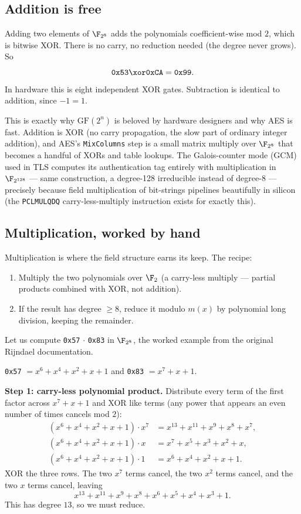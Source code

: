 \subsection{Addition is free}

Adding two elements of $\F_{2^8}$ adds the polynomials coefficient-wise mod
$2$, which is bitwise XOR. There is no carry, no reduction needed (the degree
never grows). So
\[
\texttt{0x53} \xor \texttt{0xCA} = \texttt{0x99}.
\]
In hardware this is eight independent XOR gates. Subtraction is identical to
addition, since $-1 = 1$.

\begin{applicationbox}
This is exactly why $\mathrm{GF}(2^n)$ is beloved by hardware designers and
why AES is fast. Addition is XOR (no carry propagation, the slow part of
ordinary integer addition), and AES's \texttt{MixColumns} step is a small
matrix multiply over $\F_{2^8}$ that becomes a handful of XORs and table
lookups. The Galois-counter mode (GCM) used in TLS computes its
authentication tag entirely with multiplication in $\F_{2^{128}}$ --- same
construction, a degree-128 irreducible instead of degree-8 --- precisely
because field multiplication of bit-strings pipelines beautifully in silicon
(the \texttt{PCLMULQDQ} carry-less-multiply instruction exists for exactly
this).
\end{applicationbox}

\subsection{Multiplication, worked by hand}

Multiplication is where the field structure earns its keep. The recipe:
\begin{enumerate}
  \item Multiply the two polynomials over $\F_2$ (a carry-less multiply ---
        partial products combined with XOR, not addition).
  \item If the result has degree $\geq 8$, reduce it modulo $m(x)$ by
        polynomial long division, keeping the remainder.
\end{enumerate}

Let us compute \texttt{0x57} $\cdot$ \texttt{0x83} in $\F_{2^8}$, the worked
example from the original Rijndael documentation.

\texttt{0x57} $= x^6 + x^4 + x^2 + x + 1$ and \texttt{0x83} $= x^7 + x + 1$.

\textbf{Step 1: carry-less polynomial product.} Distribute every term of the
first factor across $x^7 + x + 1$ and XOR like terms (any power that appears
an even number of times cancels mod $2$):
\[
\begin{aligned}
(x^6+x^4+x^2+x+1)\cdot x^7
  &= x^{13}+x^{11}+x^{9}+x^{8}+x^{7},\\
(x^6+x^4+x^2+x+1)\cdot x
  &= x^{7}+x^{5}+x^{3}+x^{2}+x,\\
(x^6+x^4+x^2+x+1)\cdot 1
  &= x^{6}+x^{4}+x^{2}+x+1.
\end{aligned}
\]
XOR the three rows. The two $x^7$ terms cancel, the two $x^2$ terms cancel,
and the two $x$ terms cancel, leaving
\[
x^{13}+x^{11}+x^{9}+x^{8}+x^{6}+x^{5}+x^{4}+x^{3}+1.
\]
This has degree $13$, so we must reduce.

